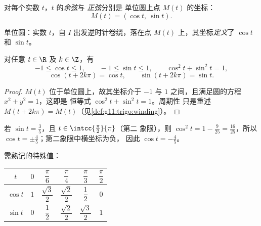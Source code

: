 \begin{definition}[余弦与正弦]\label{def:g11:trigo:cossin}
对每个实数 $t$，$t$ 的\emph{余弦}与
\emph{正弦}分别是
单位圆上点 $M(t)$ 的坐标：
\[
M(t) = (\cos t,\ \sin t).
\]
\end{definition}

\begin{omfigure}

{\small 单位圆：实数 $t$，自
$I$ 出发逆时针卷绕，落在点 $M(t)$ 上，其坐标\emph{定义}了 $\cos t$
和 $\sin t$。}
\end{omfigure}

\begin{proposition}[基本性质]\label{prop:g11:trigo:first}
对任意 $t \in \R$ 及 $k \in \Z$，有
\[
-1 \leq \cos t \leq 1, \qquad
-1 \leq \sin t \leq 1, \qquad
\cos^2 t + \sin^2 t = 1,
\]
\[
\cos(t + 2k\pi) = \cos t, \qquad \sin(t + 2k\pi) = \sin t .
\]
\end{proposition}

\begin{proof}
$M(t)$ 位于单位圆上，故其坐标介于 $-1$ 与
$1$ 之间，且满足圆的方程 $x^2 + y^2 = 1$，这即是
恒等式 $\cos^2 t + \sin^2 t = 1$。周期性
只是重述 $M(t + 2k\pi) = M(t)$（见\cref{def:g11:trigo:winding}）。
\end{proof}

\begin{example}\label{ex:g11:trigo:identity}
若 $\sin t = \frac35$，且 $t \in \intcc{\frac\pi2}{\pi}$（第二
象限），则 $\cos^2 t = 1 - \frac{9}{25} = \frac{16}{25}$，所以
$\cos t = \pm\frac45$；第二象限中横坐标为负，
因此 $\cos t = -\frac45$。
\end{example}

需熟记的特殊值：
\begin{center}
\begin{tabular}{c|ccccc}
$t$ & $0$ & $\dfrac{\pi}{6}$ & $\dfrac{\pi}{4}$ & $\dfrac{\pi}{3}$ & $\dfrac{\pi}{2}$\\[6pt]
\hline\rule{0pt}{14pt}%
$\cos t$ & $1$ & $\dfrac{\sqrt3}{2}$ & $\dfrac{\sqrt2}{2}$ & $\dfrac12$ & $0$\\[6pt]
$\sin t$ & $0$ & $\dfrac12$ & $\dfrac{\sqrt2}{2}$ & $\dfrac{\sqrt3}{2}$ & $1$
\end{tabular}
\end{center}

